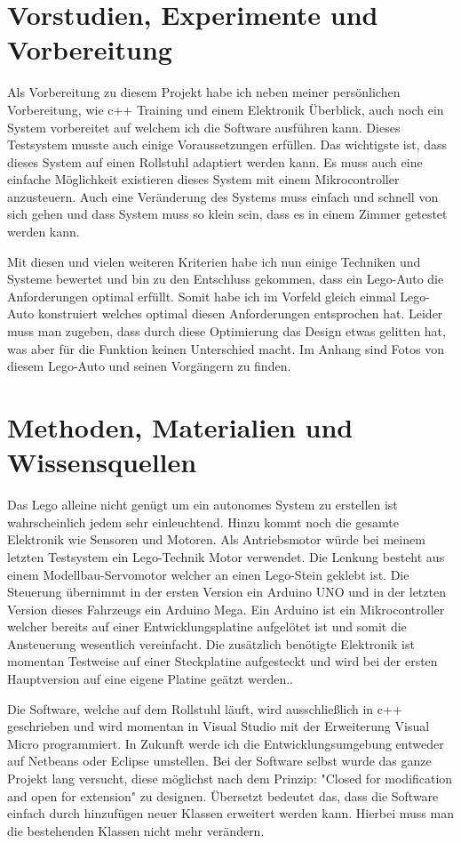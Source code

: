 \section{Vorstudien, Experimente und Vorbereitung}
Als Vorbereitung zu diesem Projekt habe ich neben meiner persönlichen Vorbereitung, wie c++ Training und einem Elektronik Überblick, auch noch ein System vorbereitet auf welchem ich die Software ausführen kann.
Dieses Testsystem musste auch einige Voraussetzungen erfüllen.
Das wichtigste ist, dass dieses System auf einen Rollstuhl adaptiert werden kann.
Es muss auch eine einfache Möglichkeit existieren dieses System mit einem Mikrocontroller anzusteuern.
Auch eine Veränderung des Systems muss einfach und schnell von sich gehen und dass System muss so klein sein, dass es in einem Zimmer getestet werden kann.

Mit diesen und vielen weiteren Kriterien habe ich nun einige Techniken und Systeme bewertet und bin zu den Entschluss gekommen, dass ein Lego-Auto die Anforderungen optimal erfüllt.
Somit habe ich im Vorfeld gleich einmal Lego-Auto konstruiert welches optimal diesen Anforderungen entsprochen hat.
Leider muss man zugeben, dass durch diese Optimierung das Design etwas gelitten hat, was aber für die Funktion keinen Unterschied macht.
Im Anhang sind Fotos von diesem Lego-Auto und seinen Vorgängern zu finden.


\section{Methoden, Materialien und Wissensquellen}
Das Lego alleine nicht genügt um ein autonomes System zu erstellen ist wahrscheinlich jedem sehr einleuchtend.
Hinzu kommt noch die gesamte Elektronik wie Sensoren und Motoren.
Als Antriebsmotor würde bei meinem letzten Testsystem ein Lego-Technik Motor verwendet.
Die Lenkung besteht aus einem Modellbau-Servomotor welcher an einen Lego-Stein geklebt ist.
Die Steuerung übernimmt in der ersten Version ein Arduino UNO und in der letzten Version dieses Fahrzeugs ein Arduino Mega.
Ein Arduino ist ein Mikrocontroller welcher bereits auf einer Entwicklungsplatine aufgelötet ist und somit die Ansteuerung wesentlich vereinfacht.
Die zusätzlich benötigte Elektronik ist momentan Testweise auf einer Steckplatine aufgesteckt und wird bei der ersten Hauptversion auf eine eigene Platine geätzt werden..

Die Software, welche auf dem Rollstuhl läuft, wird ausschließlich in c++ geschrieben und wird momentan in Visual Studio mit der Erweiterung Visual Micro programmiert.
In Zukunft werde ich die Entwicklungsumgebung entweder auf Netbeans oder Eclipse umstellen.
Bei der Software selbst wurde das ganze Projekt lang versucht, diese möglichst nach dem Prinzip: "Closed for modification and open for extension" zu designen.
Übersetzt bedeutet das, dass die Software einfach durch hinzufügen neuer Klassen erweitert werden kann.
Hierbei muss man die bestehenden Klassen nicht mehr verändern.

